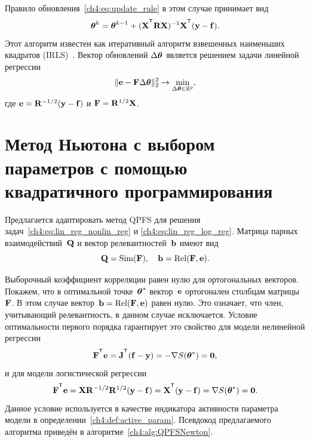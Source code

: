 Правило обновления~\eqref{ch4:eq:update_rule} в этом случае принимает вид
\[
	\btheta^k = \btheta^{k - 1} + (\bX^{\T} \bR \bX)^{-1} \bX^{\T} (\by - \mathbf{f}).
\]
Этот алгоритм известен как итеративный алгоритм взвешенных наименьших квадратов (IRLS)~\cite{holland1977robust}. Вектор обновлений $\Delta \boldsymbol{\theta}$ является решением задачи линейной регрессии
\begin{equation}
	\| \mathbf{e} - \mathbf{F} \Delta \boldsymbol{\theta} \|_2^2 \rightarrow \min_{\Delta \boldsymbol{\theta} \in \mathbb{R}^{p}},
	\label{ch4:eq:lin_reg_log_reg}
\end{equation}
где $\mathbf{e} = \mathbf{R}^{-1/2} (\mathbf{y} - \mathbf{f})$ и $\mathbf{F} = \mathbf{R}^{1/2}\mathbf{X}$.

\section{Метод Ньютона с выбором параметров с помощью квадратичного программирования}
\label{sec:ch4:newton_qpfs_algorithm}

Предлагается адаптировать метод QPFS для решения задач~\eqref{ch4:eq:lin_reg_nonlin_reg} и \eqref{ch4:eq:lin_reg_log_reg}. 
Матрица парных взаимодействий~$\mathbf{Q}$ и вектор релевантностей~$\mathbf{b}$ имеют вид
\[
	\mathbf{Q} = \text{Sim} (\mathbf{F}), \quad \mathbf{b} = \text{Rel} (\mathbf{F}, \mathbf{e}).
\]

Выборочный коэффициент корреляции равен нулю для ортогональных векторов.
Покажем, что в оптимальной точке~$\boldsymbol{\theta}^*$ вектор~$\mathbf{e}$ ортогонален столбцам матрицы~$\mathbf{F}$. 
В этом случае вектор~$\mathbf{b} = \text{Rel} (\mathbf{F}, \mathbf{e})$ равен нулю. Это означает, что член, учитывающий релевантность, в данном случае исключается.
Условие оптимальности первого порядка гарантирует это свойство для модели нелинейной регрессии
\[
	\bF^{\T} \be = \bJ^{\T} (\mathbf{f} - \by) = - \nabla S(\btheta^*) = \boldsymbol{0},
\]
и для модели логистической регрессии
\[
	\bF^{\T} \be = \bX \bR^{-1/2} \bR^{1/2} (\by - \mathbf{f}) = \bX^{\T} (\by - \mathbf{f}) = \nabla S(\btheta^*) = \boldsymbol{0}.
\]
Данное условие используется в качестве индикатора активности параметра модели в определении~\ref{ch4:def:active_param}.
Псевдокод предлагаемого алгоритма приведён в алгоритме~\ref{ch4:alg:QPFSNewton}.

